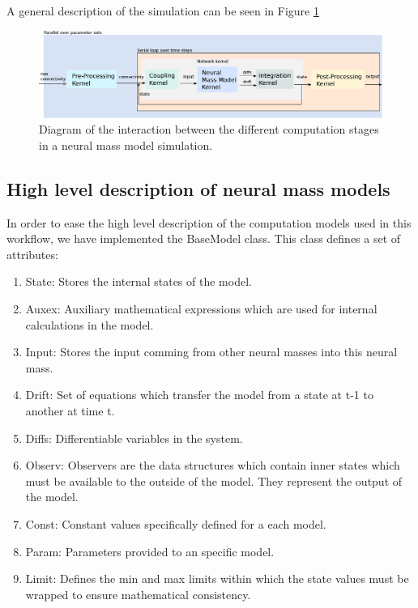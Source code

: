 \documentclass[a4paper,10pt]{article}
\begin{document}
A general description of the simulation can be seen in Figure \ref{fig}
\begin{figure}
  \begin{center}
    \includegraphics[scale=0.4]{DiagramNMM.eps}
  \end{center}
  \caption{Diagram of the interaction between the different computation stages in a neural mass model simulation.}
  \label{fig}
\end{figure}

\subsection{High level description of neural mass models}
In order to ease the high level description of the computation models used in this workflow, we have implemented the BaseModel class.
This class defines a set of attributes: 
\begin{enumerate}

\item State: Stores the internal states of the model.
\item Auxex: Auxiliary mathematical expressions which are used for internal calculations in the model.
\item Input: Stores the input comming from other neural masses into this neural mass.
\item Drift: Set of equations which transfer the model from a state at t-1 to another at time t.
\item Diffs: Differentiable variables in the system.
\item Observ: Observers are the data structures which contain inner states which must be available to the outside of the model. They represent the output of the model.
\item Const: Constant values specifically defined for a each model. 
\item Param: Parameters provided to an specific model. 
\item Limit: Defines the min and max limits within which the state values must be wrapped to ensure mathematical consistency.
 
\end{enumerate}
\end{document}
